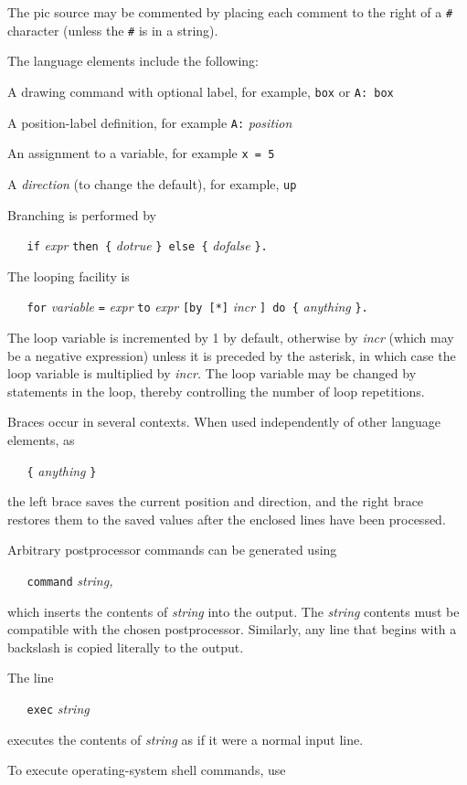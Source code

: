 The
pic
source may be commented by placing each comment to the right of a
{\tt \#}
character (unless the
{\tt \#}
is in a string).

The language elements include the following:

   A drawing command with optional label, for example,
{\tt box}
or
{\tt A:\ box}

   A position-label definition, for example
{\tt A:}
{\it position}

   An assignment to a variable, for example
{\tt x = 5}

   A
{\it direction}
(to change the default), for example,
{\tt up}

Branching is performed by

{\tt \ \ \ if}
{\it expr}
{\tt then\ \{}
{\it dotrue}
{\tt \}\ else\ \{}
{\it dofalse}
{\tt \}.}

The looping facility is

{\tt \ \ \ for}
{\it variable}
{\tt =}
{\it expr}
{\tt to}
{\it expr}
{\tt [by\ [*]}
{\it incr}
{\tt ]\ do\ \{}
{\it anything}
{\tt \}.}

The loop variable is incremented by 1 by default, otherwise by
{\it incr}
(which may be a negative expression)
unless it is preceded by the asterisk, in which case the loop variable
is multiplied by
{\it incr.}
The loop variable may be changed by statements in the loop, thereby
controlling the number of loop repetitions.

Braces occur in several contexts.
When used independently of other language elements, as

{\tt \ \ \ \{}
{\it anything}
{\tt \}}

the left brace
saves the current position and direction, and the right brace restores
them to the saved values after the enclosed lines have been processed.

Arbitrary postprocessor commands can be generated using

{\tt \ \ \ command}
{\it string,}

which inserts the contents of
{\it string}
into the output.
The
{\it string}
contents must be compatible with the chosen postprocessor.
Similarly, any line that begins with a backslash is copied literally
to the output.

The line

{\tt \ \ \ exec}
{\it string}

executes the contents of
{\it string}
as if it were a normal input line.

To execute operating-system shell commands, use

